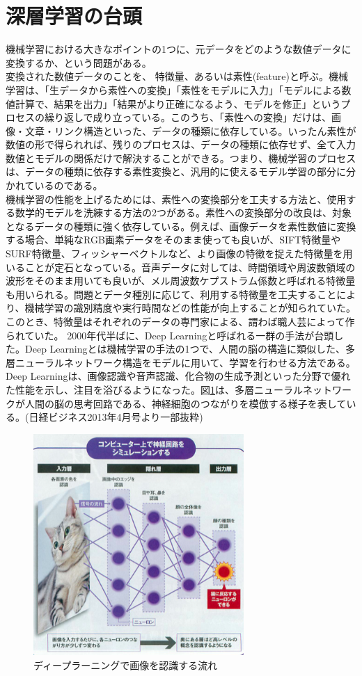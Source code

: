 \section{深層学習の台頭}
機械学習における大きなポイントの1つに、元データをどのような数値データに変換するか、という問題がある。\\
変換された数値データのことを、 特徴量、あるいは素性(feature)と呼ぶ。機械学習は、「生データから素性への変換」「素性をモデルに入力」「モデルによる数値計算で、結果を出力」「結果がより正確になるよう、モデルを修正」というプロセスの繰り返しで成り立っている。このうち、「素性への変換」だけは、画像・文章・リンク構造といった、データの種類に依存している。いったん素性が数値の形で得られれば、残りのプロセスは、データの種類に依存せず、全て入力数値とモデルの関係だけで解決することができる。つまり、機械学習のプロセスは、データの種類に依存する素性変換と、汎用的に使えるモデル学習の部分に分かれているのである。\\
機械学習の性能を上げるためには、素性への変換部分を工夫する方法と、使用する数学的モデルを洗練する方法の2つがある。素性への変換部分の改良は、対象となるデータの種類に強く依存している。例えば、画像データを素性数値に変換する場合、単純なRGB画素データをそのまま使っても良いが、SIFT特徴量やSURF特徴量、フィッシャーベクトルなど、より画像の特徴を捉えた特徴量を用いることが定石となっている。音声データに対しては、時間領域や周波数領域の波形をそのまま用いても良いが、メル周波数ケプストラム係数と呼ばれる特徴量も用いられる。問題とデータ種別に応じて、利用する特徴量を工夫することにより、機械学習の識別精度や実行時間などの性能が向上することが知られていた。このとき、特徴量はそれぞれのデータの専門家による、謂わば職人芸によって作られていた。
2000年代半ばに、Deep Learningと呼ばれる一群の手法が台頭した。Deep Learningとは機械学習の手法の1つで、人間の脳の構造に類似した、多層ニューラルネットワーク構造をモデルに用いて、学習を行わせる方法である。Deep Learningは、画像認識や音声認識、化合物の生成予測といった分野で優れた性能を示し、注目を浴びるようになった。図\ref{c1_nikkei}は、多層ニューラルネットワークが人間の脳の思考回路である、神経細胞のつながりを模倣する様子を表している。(日経ビジネス2013年4月号より一部抜粋)\\
\begin{figure}[tbp]
 \begin{center}
  \includegraphics[width=80mm]{img/c1/nikkei}
 \end{center}
 \caption{ディープラーニングで画像を認識する流れ}
 \label{c1_nikkei}
\end{figure}
